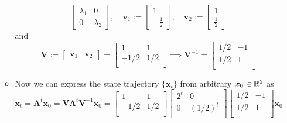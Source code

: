 \documentclass[12pt,a4paper]{article}
\begin{document}
\begin{itemize}
\begin{itemize}
\begin{equation}
\begin{bmatrix}
       \lambda_{1} & 0\\
       0 & \lambda_{2}
      \end{bmatrix},
      \quad
      \bm{v}_{1} :=
      \begin{bmatrix}
        1 \\
        - \frac{1}{2}
      \end{bmatrix},
      \quad
      \bm{v}_{2} :=
      \begin{bmatrix}
        1 \\
        \frac{1}{2}
      \end{bmatrix}
    \end{equation}
    and
    \begin{equation}\nonumber%
      \bm{V}:=
      \begin{bmatrix}
        \bm{v}_{1} & \bm{v}_{2}
      \end{bmatrix}
      =
      \begin{bmatrix}
        1 & 1 \\
        -1/2 & 1/2 \\
      \end{bmatrix}
      \implies
      \bm{V}^{-1} =
      \begin{bmatrix}
        1/2 & -1 \\
        1/2 & 1 \\
      \end{bmatrix}
      \end{equation}
    \item Now we can express the state trajectory $\{\bm{x}_{t}\}$ from arbitrary $\bm{x}_{0}\in \mathbb{R}^{2}$ as
      \begin{equation}\nonumber%
        \bm{x}_{t} =
        \bm{A}^{t}\bm{x}_{0}
        =
        \bm{V}\bm{\Lambda}^{t}\bm{V}^{-1}\bm{x}_{0}
        =
      \begin{bmatrix}
        1 & 1 \\
        -1/2 & 1/2 \\
      \end{bmatrix}
      \begin{bmatrix}
        2^{t} & 0 \\
        0 & (1/2)^{t} \\
      \end{bmatrix}
      \begin{bmatrix}
        1/2 & -1 \\
        1/2 & 1 \\
      \end{bmatrix}
      \bm{x}_{0}

\end{equation}
\end{itemize}
\end{itemize}
\end{document}
